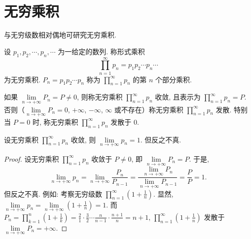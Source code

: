 \section{无穷乘积}\label{sec:12.5}

与无穷级数相对偶地可研究无穷乘积.

\begin{definition}\label{def:12.5.1}
设 $p_{1},p_{2},\cdots,p_{n},\cdots$ 为一给定的数列. 称形式乘积
\[
  \prod_{n=1}^{\infty}p_{n}=p_{1}p_{2}\cdots p_{n}\cdots
\]
为无穷乘积. $P_{n}=p_{1}p_{2}\cdots p_{n}$ 称为 $\prod_{n=1}^{\infty}p_{n}$ 的第 $n$ 个部分乘积.
\end{definition}

如果 $\lim\limits_{n\to+\infty}P_{n}=P\neq0$, 则称无穷乘积 $\prod_{n=1}^{\infty}p_{n}$ 收敛, 且表示为 $\prod_{n=1}^{\infty}p_{n}=P$. 否则（$\lim\limits_{n\to+\infty}P_{n}=0$, $+\infty$, $-\infty$, $\infty$ 或不存在）称无穷乘积 $\prod_{n=1}^{\infty}p_{n}$ 发散. 特别当 $P=0$ 时, 称无穷乘积 $\prod_{n=1}^{\infty}p_{n}$ 发散于 $0$.

\begin{theorem}[无穷乘积收敛的必要条件]\label{thm:12.5.1}
设无穷乘积 $\prod_{n=1}^{\infty}p_{n}$ 收敛, 则 $\lim\limits_{n\to+\infty}p_{n}=1$. 但反之不真.
\end{theorem}

\begin{proof}
设无穷乘积 $\prod_{n=1}^{\infty}p_{n}$ 收敛于 $P\neq0$, 即 $\lim\limits_{n\to+\infty}P_{n}=P$. 于是,
\[
  \lim_{n\to+\infty}p_{n}=\lim_{n\to+\infty}\frac{P_{n}}{P_{n-1}}=\frac{\lim\limits_{n\to+\infty}P_{n}}{\lim\limits_{n\to+\infty}P_{n-1}}=\frac{P}{P}=1.
\]
但反之不真. 例如: 考察无穷级数 $\prod_{n=1}^{\infty}\left(1+\frac{1}{n}\right)$. 显然, $\lim\limits_{n\to+\infty}p_{n}=\lim\limits_{n\to+\infty}\left(1+\frac{1}{n}\right)=1$. 而 $P_{n}=\prod_{k=1}^{n}\left(1+\frac{1}{k}\right)=\frac{2}{1}\cdot\frac{3}{2}\cdots\frac{n}{n-1}\cdot\frac{n+1}{n}=n+1$, $\prod_{n=1}^{\infty}\left(1+\frac{1}{n}\right)$ 发散于 $\lim\limits_{n\to+\infty}P_{n}=+\infty$.
\end{proof}

